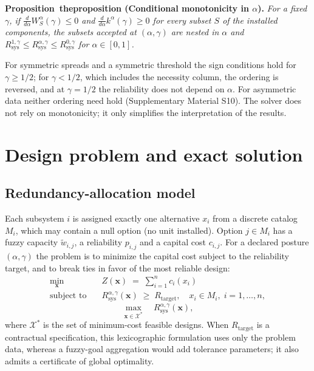 \documentclass[Review,sagev,times]{sagej}%
\newcommand{\stmt}[3]{\refstepcounter{#1}\label{#2}#3~\csname the#1\endcsname}
\newcommand{\Rsys}{R_{\mathrm{sys}}}\newcommand{\Rtarget}{R_{\mathrm{target}}}
\newcommand{\kag}{k^{\alpha}(\gamma)}\newcommand{\WS}{\tilde{W}_S}\newcommand{\Zsuf}{Z^{\mathrm{suf}}}
\begin{document}
\textbf{\stmt{proposition}{prop:alpha_monotone}{Proposition} (Conditional monotonicity in $\alpha$).}
\textit{For a fixed $\gamma$, if $\frac{d}{d\alpha}W_S^\alpha(\gamma) \le 0$ and $\frac{d}{d\alpha}\kag \ge 0$ for
every subset $S$ of the installed components, the subsets accepted at $(\alpha,\gamma)$ are nested in $\alpha$
and $\Rsys^{1,\gamma} \leq \Rsys^{\alpha,\gamma} \leq \Rsys^{0,\gamma}$ for $\alpha\in[0,1]$.}

For symmetric spreads and a symmetric threshold the sign conditions hold for $\gamma\ge 1/2$; for $\gamma<1/2$,
which includes the necessity column, the ordering is reversed, and at $\gamma=1/2$ the reliability does not
depend on $\alpha$. For asymmetric data neither ordering need hold (Supplementary Material S10). The solver does
not rely on monotonicity; it only simplifies the interpretation of the results.

\section{Design problem and exact solution} \label{sec:redundancy_framework}

\subsection{Redundancy-allocation model} \label{sec:opt_model}
Each subsystem $i$ is assigned exactly one alternative $x_i$ from a discrete catalog $M_i$, which may contain a
null option (no unit installed). Option $j\in M_i$ has a fuzzy capacity $\tilde{w}_{i,j}$, a reliability
$p_{i,j}$ and a capital cost $c_{i,j}$. For a declared posture $(\alpha,\gamma)$ the problem is to minimize the
capital cost subject to the reliability target, and to break ties in favor of the most reliable design:
\begin{align}
\min_{\mathbf{x}} \quad & Z(\mathbf{x}) \;=\; \sum_{i=1}^{n} c_i(x_i) \label{eq:opt_cost} \\
\text{subject to} \quad & \Rsys^{\alpha,\gamma}(\mathbf{x}) \;\ge\; \Rtarget, \quad x_i \in M_i,\; i=1,\dots,n, \label{eq:opt_rel}
\end{align}
\begin{equation}
\max_{\mathbf{x} \in \mathcal{X}^*} \quad \Rsys^{\alpha,\gamma}(\mathbf{x}),
\label{eq:opt_tiebreak}
\end{equation}
where $\mathcal{X}^*$ is the set of minimum-cost feasible designs. When $\Rtarget$ is a contractual
specification, this lexicographic formulation uses only the problem data, whereas a fuzzy-goal aggregation
would add tolerance parameters\cite{Zimmermann2001}; it also admits a certificate of global optimality.
\end{document}
